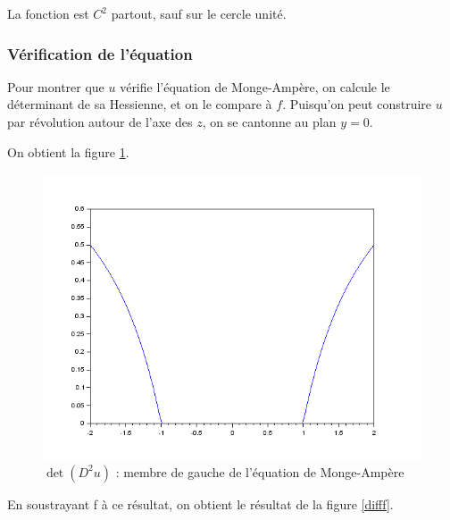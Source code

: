 \documentclass[12pt,a4paper,twoside]{article}
\begin{document}
La fonction est $C^2$ partout, sauf sur le cercle unité.

\subsubsection{Vérification de l'équation}

Pour montrer que $u$ vérifie l'équation de Monge-Ampère, on calcule le déterminant de sa Hessienne, et on le compare à $f$. Puisqu'on peut construire $u$ par révolution autour de l'axe des $z$, on se cantonne au plan $y=0$.

On obtient la figure \ref{hessienne}.


\begin{figure}[!h]
\begin{center}
\includegraphics[scale=0.5]{Images/approxhessian.png}
\caption{$\det(D^2 u)$ : membre de gauche de l'équation de Monge-Ampère}
\label{hessienne}
\end{center}
\end{figure}

En soustrayant f à ce résultat, on obtient le résultat de la figure \ref{difff}.
\end{document}
